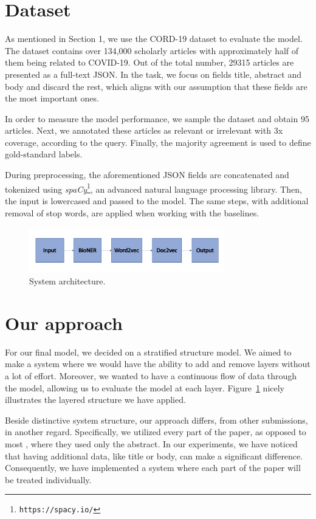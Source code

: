 \documentclass[10pt, a4paper]{article}
\begin{document}
	\section{Dataset}

	As mentioned in Section 1, we use the CORD-19 dataset to evaluate the model. The dataset contains over 134,000 scholarly articles with approximately half of them being related to COVID-19. Out of the total number, 29315 articles are presented as a full-text JSON. In the task, we focus on fields title, abstract and body and discard the rest, which aligns with our assumption that these fields are the most important ones.
	
	In order to measure the model performance, we sample the dataset and obtain 95 articles. Next, we annotated these articles as relevant or irrelevant with 3x coverage, according to the query. Finally, the majority agreement is used to define gold-standard labels.  
	
	During preprocessing, the aforementioned JSON fields are concatenated and tokenized using \emph{spaCy}\footnote{\texttt{https://spacy.io/}}, an advanced natural language processing library. Then, the input is lowercased and passed to the model. The same steps, with additional removal of stop words, are applied when working with the baselines.
	
	\begin{figure}[h]
		\centering
		\includegraphics[width=8.5cm]{model}
		\caption{ System architecture.}
		\label{figure:model1}
	\end{figure}
	
	\section{Our approach}
	
	For our final model, we decided on a stratified structure model. We aimed to make a system where we would have the ability to add and remove layers without a lot of effort. Moreover, we wanted to have a continuous flow of data through the model, allowing us to evaluate the model at each layer. Figure~\ref{figure:model1} nicely illustrates the layered structure we have applied. 
	
	Beside distinctive system structure, our approach differs, from other submissions, in another regard. Specifically, we utilized every part of the paper, as opposed to most , where they used only the abstract. In our experiments, we have noticed that having additional data, like title or body, can make a significant difference. Consequently, we have implemented a system where each part of the paper will be treated individually. 
	
\end{document}
